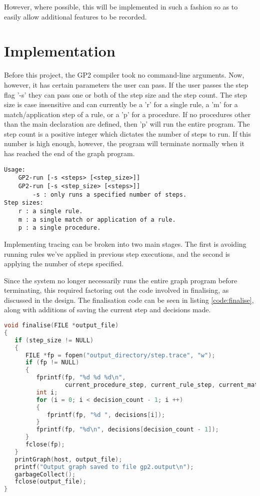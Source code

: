 \documentclass{UoYCSproject}
\begin{document}
However, where possible, this will be implemented in such a fashion so as to easily allow additional features to be recorded.

\chapter{Implementation}

Before this project, the GP2 compiler took no command-line arguments. Now, however, it has certain parameters the user can pass. If the user passes the step flag '-s' they can pass one or both of the step size and the step count. The step size is case insensitive and can currently be a 'r' for a single rule, a 'm' for a match/application step of a rule, or a 'p' for a procedure. If no procedures other than the main declaration are defined, then 'p' will run the entire program. The step count is a positive integer which dictates the number of steps to run. If this number is high enough, however, the program will terminate normally when it has reached the end of the graph program.

\begin{lstlisting}[label=code:usage, caption=GP2 Usage]
Usage:
    GP2-run [-s <steps> [<step_size>]]
    GP2-run [-s <step_size> [<steps>]]
        -s : only runs a specified number of steps.
Step sizes:
    r : a single rule.
    m : a single match or application of a rule.
    p : a single procedure.
\end{lstlisting}

Implementing tracing can be broken into two main stages. The first is avoiding running rules we've applied in previous step executions, and the second is applying the number of steps specified. 

Since the system no longer necessarily runs the entire graph program before terminating, this required factoring out the code involved in finalising, as discussed in the design. The finalisation code can be seen in listing \ref{code:finalise}, along with additions of saving the current step and decisions made.

\begin{minipage}{\linewidth} %
\begin{lstlisting}[label=code:finalise, caption=Finalise step, language=C]
void finalise(FILE *output_file)
{
   if (step_size != NULL)
   {
      FILE *fp = fopen("output_directory/step.trace", "w");
      if (fp != NULL)
      {
         fprintf(fp, "%d %d %d\n", 
                 current_procedure_step, current_rule_step, current_match_step);
         int i;
         for (i = 0; i < decision_count - 1; i ++)
         {
            fprintf(fp, "%d ", decisions[i]);
         }
         fprintf(fp, "%d\n", decisions[decision_count - 1]);
      }
      fclose(fp);
   }
   printGraph(host, output_file);
   printf("Output graph saved to file gp2.output\n");
   garbageCollect();
   fclose(output_file);
}
\end{lstlisting}
\end{minipage}
\end{document}
